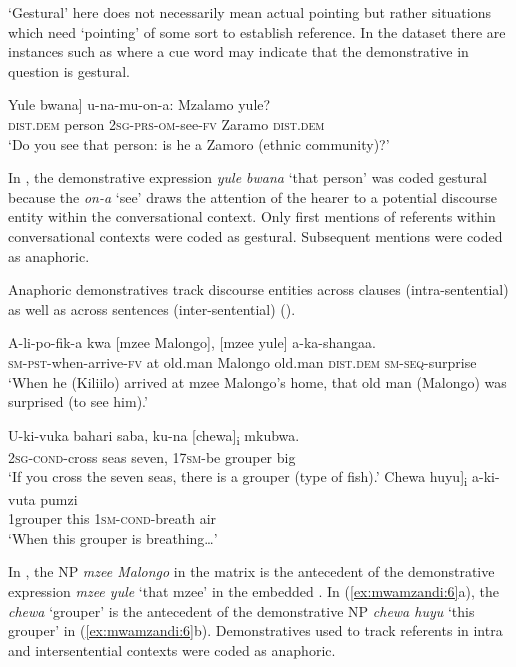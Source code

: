 \documentclass[output=paper,
modfonts
]{langscibook}
\begin{document}
‘Gestural’ here does not necessarily mean actual pointing but rather situations which need ‘pointing’ of some sort to establish reference. In the dataset there are instances such as  where a cue word may indicate that the demonstrative in question is gestural.

\ea\label{ex:mwamzandi:4}
\gll {\ob}Yule bwana] u-na-mu-on-a: Mzalamo yule?\\
     {\db}\textsc{dist}.\textsc{dem} person \textsc{2sg}{}-\textsc{prs}{}-\textsc{om}{}-see-\textsc{fv} Zaramo \textsc{dist}.\textsc{dem}\\
\glt ‘Do you see that person: is he a Zamoro (ethnic community)?’
\z

In , the demonstrative expression \textit{yule bwana} ‘that person’ was coded gestural because the  \textit{on-a} ‘see’ draws the attention of the hearer to a potential discourse entity within the conversational context. Only first mentions of referents within conversational contexts were coded as gestural. Subsequent mentions were coded as anaphoric.

Anaphoric demonstratives track discourse entities across clauses (intra-sentential)  as well as across sentences (inter-sentential)  (\citealt{BotleyMcEnery2000}).

\ea\label{ex:mwamzandi:5}
\gll A-li-po-fik-a kwa [mzee Malongo], [mzee yule] a-ka-shangaa.\\
     \textsc{sm}{}-\textsc{pst}{}-when-arrive-\textsc{fv} at old.man Malongo old.man \textsc{dist}.\textsc{dem} \textsc{sm}{}-\textsc{seq}{}-surprise\\
\glt ‘When he (Kiliilo) arrived at mzee Malongo’s home, that old man (Malongo) was surprised (to see him).’
\z

\ea\label{ex:mwamzandi:6}
\ea 
\gll  U-ki-vuka bahari saba, ku-na [chewa]\textsubscript{i} mkubwa.\\
     \textsc{2sg}{}-\textsc{cond}{}-cross seas seven, \textsc{17sm}{}-be grouper big\\
\glt ‘If you cross the seven seas, there is a grouper (type of fish).’
\ex
\gll {\ob}Chewa huyu]\textsubscript{i} a-ki-vuta pumzi\\
     {\db}1grouper this \textsc{1sm}{}-\textsc{cond}{}-breath air\\
\glt ‘When this grouper is breathing…’
\z
\z

In , the NP \textit{mzee Malongo} in the matrix  is the antecedent of the demonstrative expression \textit{mzee yule} ‘that mzee’ in the embedded . In (\ref{ex:mwamzandi:6}a), the  \textit{chewa} ‘grouper’ is the antecedent of the demonstrative NP \textit{chewa huyu} ‘this grouper’ in (\ref{ex:mwamzandi:6}b). Demonstratives used to track referents in intra and intersentential contexts were coded as anaphoric.
\end{document}
